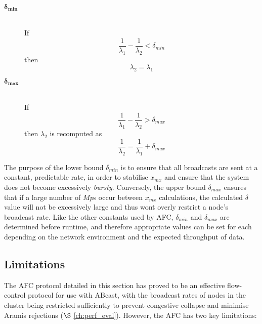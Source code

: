     \begin{description}
        \item[\Huge$\boldsymbol{\delta_{min}}$] \hfill \\
        If
        \begin{equation*}
            \frac{1}{\lambda_1} - \frac{1}{\lambda_2} < \delta_{min}
        \end{equation*}
        then
        \begin{equation*}
            \lambda_2 = \lambda_1
        \end{equation*}
        
        \item[\Huge$\boldsymbol{\delta_{max}}$] \hfill \\
        If
        \begin{equation*}
            \frac{1}{\lambda_1} - \frac{1}{\lambda_2} > \delta_{max}
        \end{equation*}
        then $\lambda_2$ is recomputed as
        \begin{equation*}
           \frac{1}{\lambda_2} = \frac{1}{\lambda_1} + \delta_{max}
        \end{equation*}
    \end{description}
    
    The purpose of the lower bound $\delta_{min}$ is to ensure that all broadcasts are sent at a constant, predictable rate, in order to stabilise $x_{mx}$ and ensure that the system does not become excessively \emph{bursty}.  Conversely, the upper bound $\delta_{max}$ ensures that if a large number of $Mp$s occur between $x_{mx}$ calculations, the calculated $\delta$ value will not be excessively large and thus wont overly restrict a node's broadcast rate.  Like the other constants used by AFC, $\delta_{min}$ and $\delta_{max}$ are determined before runtime, and therefore appropriate values can be set for each depending on the network environment and the expected throughput of data. 

    \subsection{Limitations}
    The AFC protocol detailed in this section has proved to be an effective flow-control protocol for use with \textsf{ABcast}, with the broadcast rates of nodes in the cluster being restricted sufficiently to prevent congestive collapse and minimise \textsf{Aramis} rejections ($\S$ \ref{ch:perf_eval}).  However, the AFC has  two key limitations:  
    
